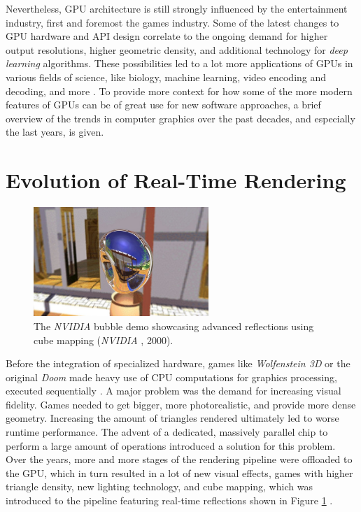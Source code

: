 \clearpage

\noindent
Nevertheless, \ac{GPU} architecture is still strongly influenced by the entertainment 
industry, first and foremost the games industry. Some of the latest changes to \ac{GPU} 
hardware and \ac{API} design correlate to the ongoing demand for higher output resolutions, 
higher geometric density, and additional technology for \emph{deep learning} algorithms. 
These possibilities led to a lot more applications of \ac{GPU}s in various fields of science, 
like biology, machine learning, video encoding and decoding, and more \cite{Battaglia2024}.
To provide more context for how some of the more modern features of \ac{GPU}s can be of great 
use for new software approaches, a brief overview of the trends in computer graphics over 
the past decades, and especially the last years, is given.


\section{Evolution of Real-Time Rendering} \label{sec-evolution-of-real-time-rendering}

\begin{figure}[h]
    \centering
    \includegraphics[width=250px]{images/graphics/bubble-reflection-effects-demo.jpg}
    \caption{The \emph{NVIDIA} bubble demo showcasing advanced reflections using cube mapping (\emph{NVIDIA} \cite{NVIDIABubble}, 2000).}
    \label{fig:bubble-reflection-demo}
\end{figure}

\noindent
Before the integration of specialized hardware, games like \emph{Wolfenstein 3D} or the 
original \emph{Doom} made heavy use of \ac{CPU} computations for graphics processing, 
executed sequentially \cite{NVIDIA1999}. A major problem was the demand for increasing 
visual fidelity. Games needed to get bigger, more photorealistic, and provide more dense 
geometry. Increasing the amount of triangles rendered ultimately led to worse runtime 
performance. The advent of a dedicated, massively parallel chip to perform a large amount of 
operations introduced a solution for this problem. Over the years, more and more stages of the 
rendering pipeline were offloaded to the \ac{GPU}, which in turn resulted in a lot of new visual 
effects, games with higher triangle density, new lighting technology, and cube mapping, which 
was introduced to the pipeline featuring real-time reflections shown in  Figure 
\ref{fig:bubble-reflection-demo} \cite{Battaglia2024}.

